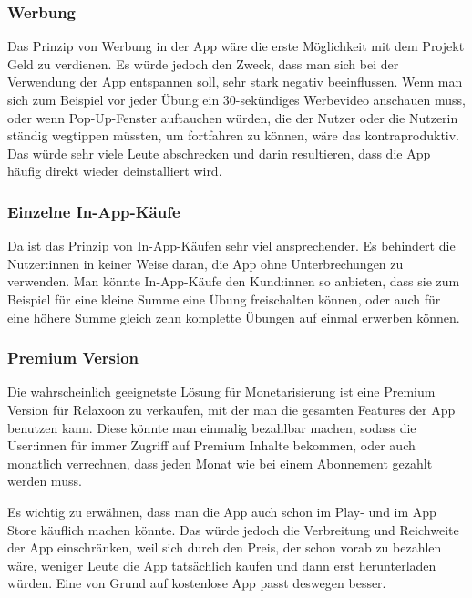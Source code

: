 \subsubsection{Werbung}

Das Prinzip von Werbung in der App wäre die erste Möglichkeit mit dem Projekt Geld zu verdienen. 
Es würde jedoch den Zweck, dass man sich bei der Verwendung der App entspannen soll, sehr stark negativ beeinflussen.
Wenn man sich zum Beispiel vor jeder Übung ein 30-sekündiges Werbevideo anschauen muss, oder wenn Pop-Up-Fenster 
auftauchen würden, die der Nutzer oder die Nutzerin ständig wegtippen müssten, um fortfahren zu können, wäre das
kontraproduktiv. Das würde
sehr viele Leute abschrecken und darin resultieren, dass die App häufig direkt wieder deinstalliert wird.

\subsubsection{Einzelne In-App-Käufe}

Da ist das Prinzip von In-App-Käufen sehr viel ansprechender. Es behindert die Nutzer:innen in keiner Weise daran,
die App ohne Unterbrechungen zu verwenden. Man könnte In-App-Käufe den Kund:innen so anbieten, dass sie zum
Beispiel für eine kleine Summe eine Übung freischalten können, oder auch für eine höhere Summe gleich zehn komplette
Übungen auf einmal erwerben können. 

\subsubsection{Premium Version}

Die wahrscheinlich geeignetste Lösung für Monetarisierung ist eine Premium Version für Relaxoon zu verkaufen, mit
der man die gesamten Features der App benutzen kann. Diese könnte man einmalig bezahlbar machen, sodass die User:innen
für immer Zugriff auf Premium Inhalte bekommen, oder auch 
monatlich verrechnen, dass jeden Monat wie bei einem Abonnement gezahlt werden muss.

\newpage

Es wichtig zu erwähnen, dass man die App auch schon im Play- und im App Store käuflich machen könnte. Das würde
jedoch die Verbreitung und Reichweite der App einschränken, weil sich durch den Preis, der schon vorab zu bezahlen
wäre, weniger Leute die App tatsächlich kaufen und dann erst herunterladen würden. Eine von Grund auf kostenlose
App passt deswegen besser.

